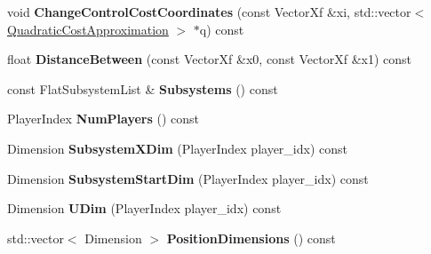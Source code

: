 \begin{DoxyCompactItemize}
\item 
void {\bfseries Change\+Control\+Cost\+Coordinates} (const Vector\+Xf \&xi, std\+::vector$<$ \hyperlink{structilqgames_1_1_quadratic_cost_approximation}{Quadratic\+Cost\+Approximation} $>$ $\ast$q) const \hypertarget{classilqgames_1_1_concatenated_flat_system_a41de9dc81c1e121c0967f6c6f9a1e966}{}\label{classilqgames_1_1_concatenated_flat_system_a41de9dc81c1e121c0967f6c6f9a1e966}

\item 
float {\bfseries Distance\+Between} (const Vector\+Xf \&x0, const Vector\+Xf \&x1) const \hypertarget{classilqgames_1_1_concatenated_flat_system_aa8d39832e2b73f2666415639e02ccc4e}{}\label{classilqgames_1_1_concatenated_flat_system_aa8d39832e2b73f2666415639e02ccc4e}

\item 
const Flat\+Subsystem\+List \& {\bfseries Subsystems} () const \hypertarget{classilqgames_1_1_concatenated_flat_system_a85bf62fb46eb94efe02131b6f73f0157}{}\label{classilqgames_1_1_concatenated_flat_system_a85bf62fb46eb94efe02131b6f73f0157}

\item 
Player\+Index {\bfseries Num\+Players} () const \hypertarget{classilqgames_1_1_concatenated_flat_system_a502e29574127d8dc373beeab9306edde}{}\label{classilqgames_1_1_concatenated_flat_system_a502e29574127d8dc373beeab9306edde}

\item 
Dimension {\bfseries Subsystem\+X\+Dim} (Player\+Index player\+\_\+idx) const \hypertarget{classilqgames_1_1_concatenated_flat_system_ab721151b47937d8a8f4523b2a1ef12f1}{}\label{classilqgames_1_1_concatenated_flat_system_ab721151b47937d8a8f4523b2a1ef12f1}

\item 
Dimension {\bfseries Subsystem\+Start\+Dim} (Player\+Index player\+\_\+idx) const \hypertarget{classilqgames_1_1_concatenated_flat_system_af2aa76a51e22b4fa744b1f8e425216ff}{}\label{classilqgames_1_1_concatenated_flat_system_af2aa76a51e22b4fa744b1f8e425216ff}

\item 
Dimension {\bfseries U\+Dim} (Player\+Index player\+\_\+idx) const \hypertarget{classilqgames_1_1_concatenated_flat_system_a2cb3c62d20eeac814f1b72e4d8355b80}{}\label{classilqgames_1_1_concatenated_flat_system_a2cb3c62d20eeac814f1b72e4d8355b80}

\item 
std\+::vector$<$ Dimension $>$ {\bfseries Position\+Dimensions} () const \hypertarget{classilqgames_1_1_concatenated_flat_system_a31dc8d20b0735223ce285262c17286f6}{}\label{classilqgames_1_1_concatenated_flat_system_a31dc8d20b0735223ce285262c17286f6}

\end{DoxyCompactItemize}
